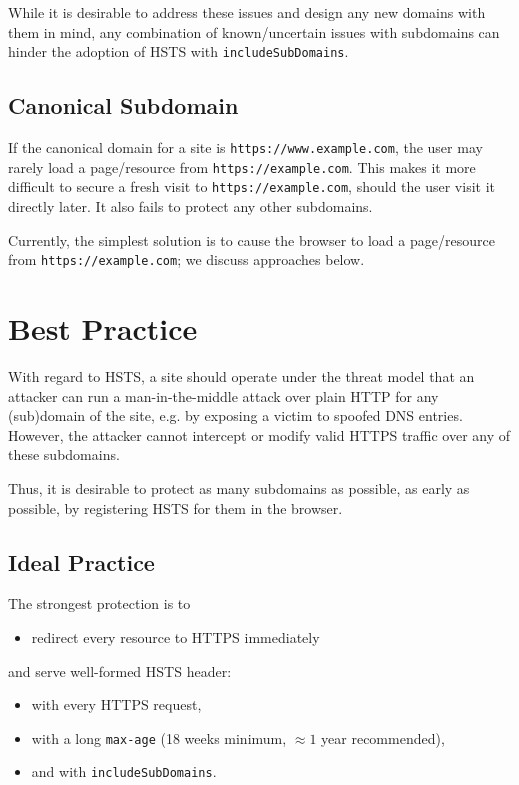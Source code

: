 \documentclass[conference]{./IEEEtran}
\newcommand{\site}[1]{\texttt{#1}}
\newcommand{\code}[1]{\texttt{#1}}
\newcommand{\iSD}{{\code{includeSubDomains}}}
\newcommand{\genericsite}{example.com}
\newcommand{\s}{{\site{https://\genericsite}}}
\newcommand{\sw}{{\site{https://www.\genericsite}}}
\theoremstyle{plain}
\begin{document}
While it is desirable to address these issues and design any new domains with them in mind, any combination of known/uncertain issues with subdomains can hinder the adoption of HSTS with \iSD.

\subsection{Canonical Subdomain}

If the canonical domain for a site is \sw, the user may rarely load a page/resource from \s. This makes it more difficult to secure a fresh visit to \s, should the user visit it directly later. It also fails to protect any other subdomains.

Currently, the simplest solution is to cause the browser to load a page/resource from \s; we discuss approaches below. 

\section{Best Practice}

With regard to HSTS, a site should operate under the threat model that an attacker can run a man-in-the-middle attack over plain HTTP for any (sub)domain of the site, e.g. by exposing a victim to spoofed DNS entries. However, the attacker cannot intercept or modify valid HTTPS traffic over any of these subdomains.

Thus, it is desirable to protect as many subdomains as possible, as early as possible, by registering HSTS for them in the browser.

\subsection{Ideal Practice}


The strongest protection is to

\begin{itemize}
\item redirect every resource to HTTPS immediately
\end{itemize}

and serve well-formed  HSTS header:

\begin{itemize}
\item with every HTTPS request,
\item with a long \code{max-age} (18 weeks minimum, $\approx 1$ year recommended),
\item and with \iSD.
\end{itemize}
\end{document}
